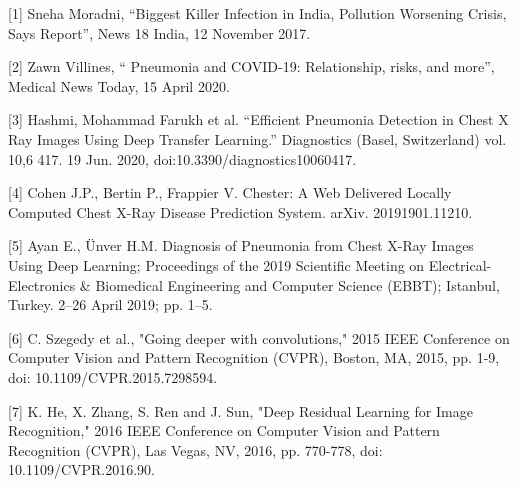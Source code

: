 \documentclass[conference]{IEEEtran}
\begin{document}
\addtolength{\textheight}{-12cm}   %



  



[1] Sneha Moradni, “Biggest Killer Infection in India,      Pollution Worsening Crisis, Says Report”, News 18  India,      12 November 2017.
\newline

[2] Zawn Villines, “ Pneumonia and COVID-19: Relationship, risks, and more”, Medical News Today, 15 April 2020. 
\newline

[3] Hashmi, Mohammad Farukh et al. “Efficient Pneumonia Detection in Chest X Ray Images Using Deep Transfer Learning.” Diagnostics (Basel, Switzerland) vol. 10,6 417. 19 Jun. 2020, doi:10.3390/diagnostics10060417.
\newline

[4] Cohen J.P., Bertin P., Frappier V. Chester: A Web Delivered Locally Computed Chest X-Ray Disease Prediction System. arXiv. 20191901.11210.
\newline

[5]  Ayan E., Ünver H.M. Diagnosis of Pneumonia from Chest X-Ray Images Using Deep Learning; Proceedings of the 2019 Scientific Meeting on Electrical-Electronics \& Biomedical Engineering and Computer Science (EBBT); Istanbul, Turkey. 2–26 April 2019; pp. 1–5.
\newline

[6] C. Szegedy et al., "Going deeper with convolutions," 2015 IEEE Conference on Computer Vision and Pattern Recognition (CVPR), Boston, MA, 2015, pp. 1-9, doi: 10.1109/CVPR.2015.7298594.
\newline

[7]  K. He, X. Zhang, S. Ren and J. Sun, "Deep Residual Learning for Image Recognition," 2016 IEEE Conference on Computer Vision and Pattern Recognition (CVPR), Las Vegas, NV, 2016, pp. 770-778, doi: 10.1109/CVPR.2016.90.
\newline
\end{document}
